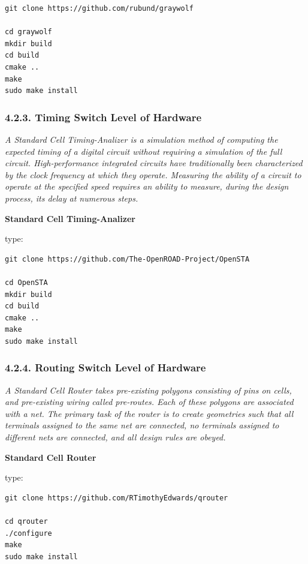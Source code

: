 \documentclass[
]{article}
\begin{document}
\begin{verbatim}
git clone https://github.com/rubund/graywolf

cd graywolf
mkdir build
cd build
cmake ..
make
sudo make install
\end{verbatim}

\hypertarget{timing-switch-level-of-hardware}{%
\subsubsection{4.2.3. Timing Switch Level of
Hardware}\label{timing-switch-level-of-hardware}}

\emph{A Standard Cell Timing-Analizer is a simulation method of
computing the expected timing of a digital circuit without requiring a
simulation of the full circuit. High-performance integrated circuits
have traditionally been characterized by the clock frequency at which
they operate. Measuring the ability of a circuit to operate at the
specified speed requires an ability to measure, during the design
process, its delay at numerous steps.}

\textbf{Standard Cell Timing-Analizer}

type:

\begin{verbatim}
git clone https://github.com/The-OpenROAD-Project/OpenSTA

cd OpenSTA
mkdir build
cd build
cmake ..
make
sudo make install
\end{verbatim}

\hypertarget{routing-switch-level-of-hardware}{%
\subsubsection{4.2.4. Routing Switch Level of
Hardware}\label{routing-switch-level-of-hardware}}

\emph{A Standard Cell Router takes pre-existing polygons consisting of
pins on cells, and pre-existing wiring called pre-routes. Each of these
polygons are associated with a net. The primary task of the router is to
create geometries such that all terminals assigned to the same net are
connected, no terminals assigned to different nets are connected, and
all design rules are obeyed.}

\textbf{Standard Cell Router}

type:

\begin{verbatim}
git clone https://github.com/RTimothyEdwards/qrouter

cd qrouter
./configure
make
sudo make install
\end{verbatim}
\end{document}
